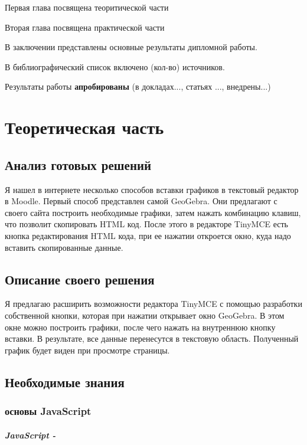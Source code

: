 \documentclass[14pt,Diplom]{diplomwork}
\begin{document}
Первая глава посвящена теоритической части

Вторая глава посвящена практической части


В заключении представлены основные результаты дипломной работы.

В библиографический список включено (кол-во) источников.


Результаты работы \textbf{апробированы} (в докладах..., статьях ..., внедрены...)


\chapter{Теоретическая часть}

\section{Анализ готовых решений}

Я нашел в интернете несколько способов вставки графиков в текстовый редактор в Moodle. Первый способ представлен самой GeoGebra. Они предлагают с своего сайта построить необходимые графики, затем нажать комбинацию клавиш, что позволит скопировать HTML код. После этого в редакторе TinyMCE есть кнопка редактирования HTML кода, при ее нажатии откроется окно, куда надо вставить скопированные данные.

\section{Описание своего решения}

Я предлагаю расширить возможности редактора TinyMCE с помощью разработки собственной кнопки, которая при нажатии открывает окно GeoGebra. В этом окне можно построить графики, после чего нажать на внутреннюю кнопку вставки. В результате, все данные перенесутся в текстовую область. Полученный график будет виден при просмотре страницы.


\section{Необходимые знания}

\subsection{основы JavaScript}

\paragraph{JavaScript -}
\end{document}
